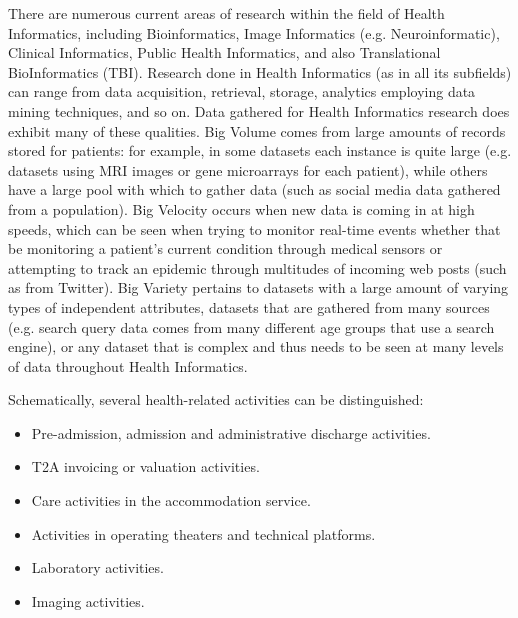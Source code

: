   \newpage
There are numerous current areas of research within the field of Health Informatics, including Bioinformatics, Image Informatics (e.g. Neuroinformatic), Clinical Informatics, Public Health Informatics, and also Translational BioInformatics (TBI). Research done in Health Informatics (as in all its subfields) can range from data acquisition, retrieval, storage, analytics employing data mining techniques, and so on.
\bigbreak
Data gathered for Health Informatics research does exhibit many of these qualities. Big Volume comes from large amounts of records stored for patients: for example, in some datasets each instance is quite large (e.g. datasets using MRI images or gene microarrays for each patient), while others have a large pool with which to gather data (such as social media data gathered from a population). Big Velocity occurs when new data is coming in at high speeds, which can be seen when trying to monitor real-time events whether that be monitoring a patient’s current condition through medical sensors or attempting to track an epidemic through multitudes of incoming web posts (such as from Twitter). Big Variety pertains to datasets with a large amount of varying types of independent attributes, datasets that are gathered from many sources (e.g. search query data comes from many different age groups that use a search engine), or any dataset that is complex and thus needs to be seen at many levels of data throughout Health Informatics.

\bigbreak
Schematically, several health-related activities can be distinguished\cite{martigneneVisualisationUnifieeDonnees}:
\begin{itemize}
  \renewcommand{\labelitemi}{$\bullet$}
  \item Pre-admission, admission and administrative discharge activities.
  \item T2A invoicing or valuation activities.
  \item Care activities in the accommodation service.
  \item Activities in operating theaters and technical platforms.
  \item Laboratory activities.
  \item Imaging activities.
\end{itemize}

